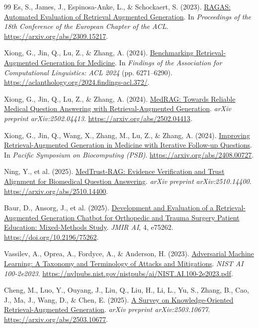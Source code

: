 \begin{thebibliography}{99}
Es, S., James, J., Espinosa-Anke, L., \& Schockaert, S. (2023).
\href{https://arxiv.org/abs/2309.15217}{RAGAS: Automated Evaluation of Retrieval Augmented Generation}.
In \textit{Proceedings of the 18th Conference of the European Chapter of the ACL}. \url{https://arxiv.org/abs/2309.15217}.

Xiong, G., Jin, Q., Lu, Z., \& Zhang, A. (2024).
\href{https://aclanthology.org/2024.findings-acl.372/}{Benchmarking Retrieval-Augmented Generation for Medicine}.
In \textit{Findings of the Association for Computational Linguistics: ACL 2024} (pp. 6271--6290). \url{https://aclanthology.org/2024.findings-acl.372/}.

Xiong, G., Jin, Q., Lu, Z., \& Zhang, A. (2024).
\href{https://arxiv.org/abs/2502.04413}{MedRAG: Towards Reliable Medical Question Answering with Retrieval-Augmented Generation}.
\textit{arXiv preprint arXiv:2502.04413}. \url{https://arxiv.org/abs/2502.04413}.

Xiong, G., Jin, Q., Wang, X., Zhang, M., Lu, Z., \& Zhang, A. (2024).
\href{https://arxiv.org/abs/2408.00727}{Improving Retrieval-Augmented Generation in Medicine with Iterative Follow-up Questions}.
In \textit{Pacific Symposium on Biocomputing (PSB)}. \url{https://arxiv.org/abs/2408.00727}.

Ning, Y., et al. (2025).
\href{https://arxiv.org/abs/2510.14400}{MedTrust-RAG: Evidence Verification and Trust Alignment for Biomedical Question Answering}.
\textit{arXiv preprint arXiv:2510.14400}. \url{https://arxiv.org/abs/2510.14400}.

Baur, D., Ansorg, J., et al. (2025).
\href{https://doi.org/10.2196/75262}{Development and Evaluation of a Retrieval-Augmented Generation Chatbot for Orthopedic and Trauma Surgery Patient Education: Mixed-Methods Study}.
\textit{JMIR AI}, 4, e75262. \url{https://doi.org/10.2196/75262}.

Vassilev, A., Oprea, A., Fordyce, A., \& Anderson, H. (2023).
\href{https://nvlpubs.nist.gov/nistpubs/ai/NIST.AI.100-2e2023.pdf}{Adversarial Machine Learning: A Taxonomy and Terminology of Attacks and Mitigations}.
\textit{NIST AI 100-2e2023}. \url{https://nvlpubs.nist.gov/nistpubs/ai/NIST.AI.100-2e2023.pdf}.

Cheng, M., Luo, Y., Ouyang, J., Liu, Q., Liu, H., Li, L., Yu, S., Zhang, B., Cao, J., Ma, J., Wang, D., \& Chen, E. (2025).
\href{https://arxiv.org/abs/2503.10677}{A Survey on Knowledge-Oriented Retrieval-Augmented Generation}.
\textit{arXiv preprint arXiv:2503.10677}. \url{https://arxiv.org/abs/2503.10677}.


\end{thebibliography}
